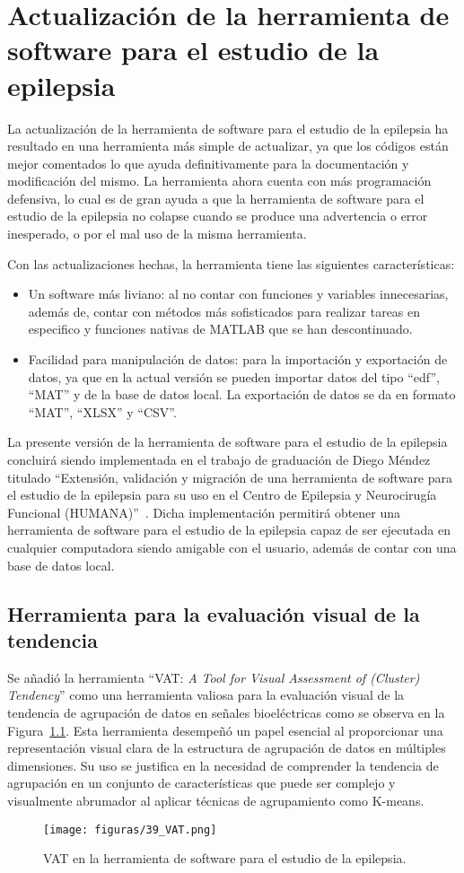\chapter{Actualización de la herramienta de software para el estudio de la epilepsia}
La actualización de la herramienta de software para el estudio de la epilepsia ha resultado en una herramienta más simple de actualizar, ya que los códigos están mejor comentados lo que ayuda definitivamente para la documentación y modificación del mismo. La herramienta ahora cuenta con más programación defensiva, lo cual es de gran ayuda a que la herramienta de software para el estudio de la epilepsia no colapse cuando se produce una advertencia o error inesperado, o por el mal uso de la misma herramienta.

Con las actualizaciones hechas, la herramienta tiene las siguientes características:
\begin{itemize}
    \item Un software más liviano: al no contar con funciones y variables innecesarias, además de, contar con métodos más sofisticados para realizar tareas en especifico y funciones nativas de MATLAB que se han descontinuado. 
    \item Facilidad para manipulación de datos: para la importación y exportación de datos, ya que en la actual versión se pueden importar datos del tipo ``edf'', ``MAT'' y de la base de datos local. La exportación de datos se da en formato ``MAT'', ``XLSX'' y ``CSV''.
\end{itemize}

La presente versión de la herramienta de software para el estudio de la epilepsia concluirá siendo implementada en el trabajo de graduación de Diego Méndez titulado ``Extensión, validación y migración de una herramienta
de software para el estudio de la epilepsia para su uso en el Centro de Epilepsia y Neurocirugía Funcional (HUMANA)''~\cite{diego_2023}. Dicha implementación permitirá obtener una herramienta de software para el estudio de la epilepsia capaz de ser ejecutada en cualquier computadora siendo amigable con el usuario, además de contar con una base de datos local.  


\section{Herramienta para la evaluación visual de la tendencia}
Se añadió la herramienta ``VAT: \textit{ A Tool for Visual Assessment of (Cluster) Tendency}'' como una herramienta valiosa para la evaluación visual de la tendencia de agrupación de datos en señales bioeléctricas como se observa en la Figura~\ref{fig: Vat_toolbox}. Esta herramienta desempeñó un papel esencial al proporcionar una representación visual clara de la estructura de agrupación de datos en múltiples dimensiones. Su uso se justifica en la necesidad de comprender la tendencia de agrupación en un conjunto de características que puede ser complejo y visualmente abrumador al aplicar técnicas de agrupamiento como K-means.

\begin{figure}[H]
	\centering
	\texttt{[image: figuras/39\_VAT.png]}
	\caption{VAT en la herramienta de software para el estudio de la epilepsia.}
	\label{fig: Vat_toolbox}
\end{figure}
